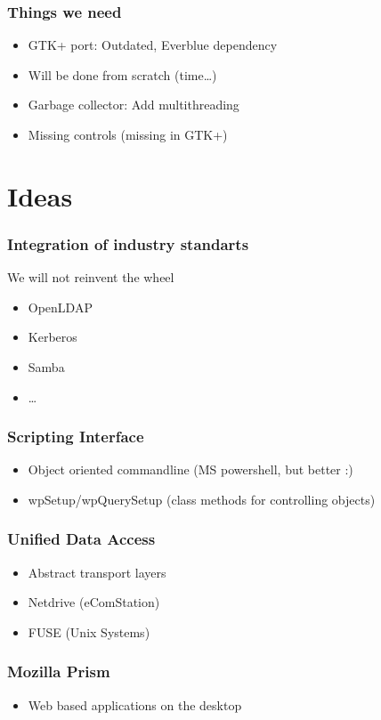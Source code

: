 \documentclass[handout]{beamer}
\begin{document}
\begin{frame}
\frametitle{Things we need}
\begin{itemize}[<+->]
  \item GTK+ port: Outdated, Everblue dependency
  \item Will be done from scratch (time\ldots)
  \item Garbage collector: Add multithreading
  \item Missing controls (missing in GTK+)
\end{itemize}
\end{frame}

\section{Ideas}

\begin{frame}
\frametitle{Integration of industry standarts}
We will not reinvent the wheel
\begin{itemize}[<+->]
  \item OpenLDAP
  \item Kerberos
  \item Samba
  \item \ldots
\end{itemize}
\end{frame}

\begin{frame}
\frametitle{Scripting Interface}
\begin{itemize}[<+->]
  \item Object oriented commandline (MS powershell, but better :)
  \item wpSetup/wpQuerySetup (class methods for controlling objects)  
\end{itemize}
\end{frame}

\begin{frame}
\frametitle{Unified Data Access}
\begin{itemize}[<+->]
  \item Abstract transport layers
  \item Netdrive (eComStation)
  \item FUSE (Unix Systems)
\end{itemize}
\end{frame}

\begin{frame}
\frametitle{Mozilla Prism}
\begin{itemize}
  \item Web based applications on the desktop
\end{itemize}
\end{frame}
\end{document}
